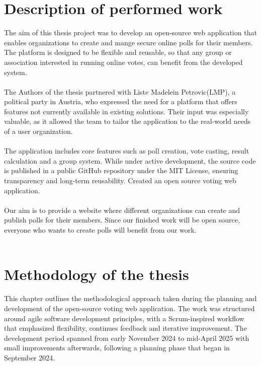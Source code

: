 \documentclass[a4paper,12pt]{report}
\begin{document}
\section{Description of performed work}
The aim of this thesis project was to develop an open-source web application that enables organizations to create and mange secure online polls for their members. The platform is designed to be flexible and reusable, so that any group or association interested in running online votes, can benefit from the developed system.\\\\
The Authors of the thesis partnered with Liste Madelein Petrovic(LMP), a political party in Austria, who expressed the need for a platform that offers features not currently available in existing solutions. Their input was especially valuable, as it allowed the team to tailor the application to the real-world needs of a user organization.\\\\
The application includes core features such as poll creation, vote casting, result calculation and a group system. While under active development, the source code is published in a public GitHub repository under the MIT License, ensuring transparency and long-term reusability. \parencite{opensourceinit} Created an open source voting web application.\\\\
Our aim is to provide a website where different organizations can create and publish polls for their members. Since our finished work will be open source, everyone who wants to create polls will benefit from our work. \\ \\

\section{Methodology of the thesis}
This chapter outlines the methodological approach taken during the planning and development of the open-source voting web application. The work was structured around agile software development principles, with a Scrum-inspired workflow that emphasized flexibility, continues feedback and iterative improvement. The development period spanned from early November 2024 to mid-April 2025 with small improvements afterwards, following a planning phase that began in September 2024. \\
\end{document}
